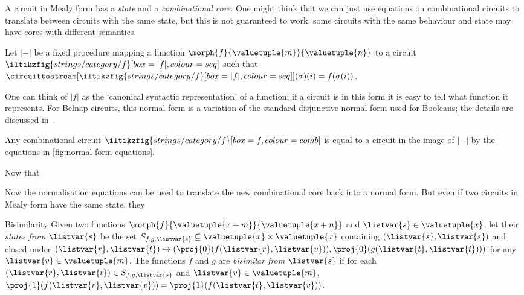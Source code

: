 \documentclass[10pt]{article}
\begin{document}
A circuit in Mealy form has a \emph{state} and a \emph{combinational core}.
One might think that we can just use equations on combinational circuits to
translate between circuits with the same state, but this is not guaranteed to
work: some circuits with the same behaviour and state may have cores with
different semantics.

\begin{definition}
    Let \(\lvert{-}\rvert\) be a fixed procedure mapping a function
    \(\morph{f}{\valuetuple{m}}{\valuetuple{n}}\) to a circuit \(
    \iltikzfig{strings/category/f}[box=|f|,colour=seq]
    \) such that \(
    \circuittostream[
        \iltikzfig{strings/category/f}[box=|f|,colour=seq]
    ]{}(\sigma)(i)
    =
    f(\sigma(i))
    \).
\end{definition}

One can think of \(|f|\) as the `canonical syntactic representation' of a
function; if a circuit is in this form it is easy to tell what function it
represents.
For Belnap circuits, this normal form is a variation of the standard disjunctive
normal form used for Booleans; the details are discussed
in~\cite[App. A]{ghica2024fully}.

\begin{lemma}
    Any combinational circuit \(
    \iltikzfig{strings/category/f}[box=f,colour=comb]
    \) is equal to a circuit in the image of \(\lvert{-}\rvert\) by the equations in
    \cref{fig:normal-form-equations}.
\end{lemma}

Now that

\begin{definition}[Encoding]

\end{definition}

Now the normalisation equations can be used to translate the new combinational
core back into a normal form.
But even if two circuits in Mealy form have the same state, they

\begin{definition}{Bisimilarity}
    Given two functions \(\morph{f}{\valuetuple{x+m}}{\valuetuple{x+n}}\) and
    \(\listvar{s} \in \valuetuple{x}\), let their
    \emph{states from \(\listvar{s}\)} be the set \(
    S_{f,g,\listvar{s}} \subseteq \valuetuple{x} \times \valuetuple{x}
    \) containing
    \((\listvar{s}, \listvar{s})\) and closed under \(
    (\listvar{r},\listvar{t})
    \mapsto
    \left(
    \proj{0}(f(\listvar{r},\listvar{v})),
    \proj{0}(g(\listvar{t},\listvar{t}))
    \right)\)
    for any \(\listvar{v} \in \valuetuple{m}\).
    The functions \(f\) and \(g\) are \emph{bisimilar from \(\listvar{s}\)}
    if for each \((\listvar{r}, \listvar{t}) \in S_{f,g,\listvar{s}}\) and
    \(\listvar{v} \in \valuetuple{m}\), \(
    \proj{1}(f(\listvar{r}, \listvar{v}))
    =
    \proj{1}(f(\listvar{t}, \listvar{v}))
    \).
\end{definition}
\end{document}

